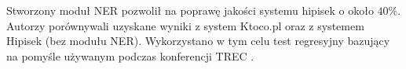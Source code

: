 Stworzony moduł NER pozwolił na poprawę jakości systemu hipisek o około $40$\%. Autorzy porównywali uzyskane wyniki z system Ktoco.pl oraz z systemem Hipisek (bez modułu NER). Wykorzystano w tym celu test regresyjny bazujący na pomyśle używanym podczas konferencji TREC \cite{polishQAS}.























